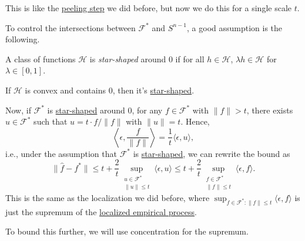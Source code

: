 \begin{intuition}
	This is like the \hyperref[eq:peeling-step]{peeling step} we did before, but now we do this for a single scale \(t\).
\end{intuition}

To control the intersections between \(\mathscr{F} ^{\ast} \) and \(S^{n-1}\), a good assumption is the following.

\begin{definition}\label{def:star-shaped}
	A class of functions \(\mathscr{H} \) is \emph{star-shaped} around \(0\) if for all \(h \in \mathscr{H} \), \(\lambda h \in \mathscr{H} \) for \(\lambda \in [0, 1]\).
\end{definition}

\begin{eg}
	If \(\mathscr{H} \) is convex and contains \(0\), then it's \hyperref[def:star-shaped]{star-shaped}.
\end{eg}

Now, if \(\mathscr{F} ^{\ast} \) is \hyperref[def:star-shaped]{star-shaped} around \(0\), for any \(f\in \mathscr{F} ^{\ast} \) with \(\lVert f \rVert > t\), there exists \(u \in \mathscr{F} ^{\ast} \) such that \(u = t \cdot f / \lVert f \rVert \) with \(\lVert u \rVert = t\). Hence,
\[
	\left\langle \epsilon , \frac{f}{\lVert f \rVert } \right\rangle
	= \frac{1}{t} \langle \epsilon , u \rangle ,
\]
i.e., under the assumption that \(\mathscr{F} ^{\ast} \) is \hyperref[def:star-shaped]{star-shaped}, we can rewrite the bound as
\begin{equation}\label{eq:constrained-LS-one-step-localized-EP-bound}
	\lVert \hat{f} - f^{\ast} \rVert
	\leq t + \frac{2}{t} \sup _{\substack{u\in \mathscr{F} ^{\ast} \\ \lVert u \rVert \leq t}} \langle \epsilon , u \rangle
	\leq t + \frac{2}{t} \sup _{\substack{f\in \mathscr{F} ^{\ast} \\ \lVert f \rVert \leq t}} \langle \epsilon , f \rangle.
\end{equation}
This is the same as the localization we did before, where \(\sup _{f\in \mathscr{F} ^{\ast} \colon \lVert f \rVert \leq t} \langle \epsilon , f \rangle \) is just the supremum of the \hyperref[def:localized-EP]{localized empirical process}.

\begin{intuition}
	To bound this further, we will use concentration for the supremum.
\end{intuition}

